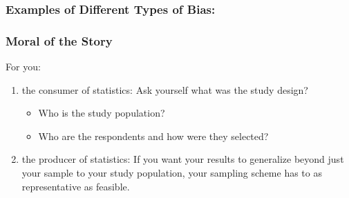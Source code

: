 \documentclass[handout]{beamer}
\newcommand{\blue}[1]{\textcolor{blue2}{#1}}
\begin{document}
\begin{frame}
\frametitle{Examples of Different Types of Bias:}

%
%
%

\end{frame}



\begin{frame}
\frametitle{Moral of the Story}
For you:
\begin{enumerate}
\pause \item \blue{the consumer of statistics}: Ask yourself what was the study design?
\begin{itemize}
\item Who is the study population?
\item Who are the respondents and how were they selected?
\end{itemize}
\pause \item \blue{the producer of statistics}:  If you want your results to generalize \blue{beyond} just your sample to your study population, your sampling scheme has to as representative as feasible.
\end{enumerate}

\end{frame}
\end{document}
